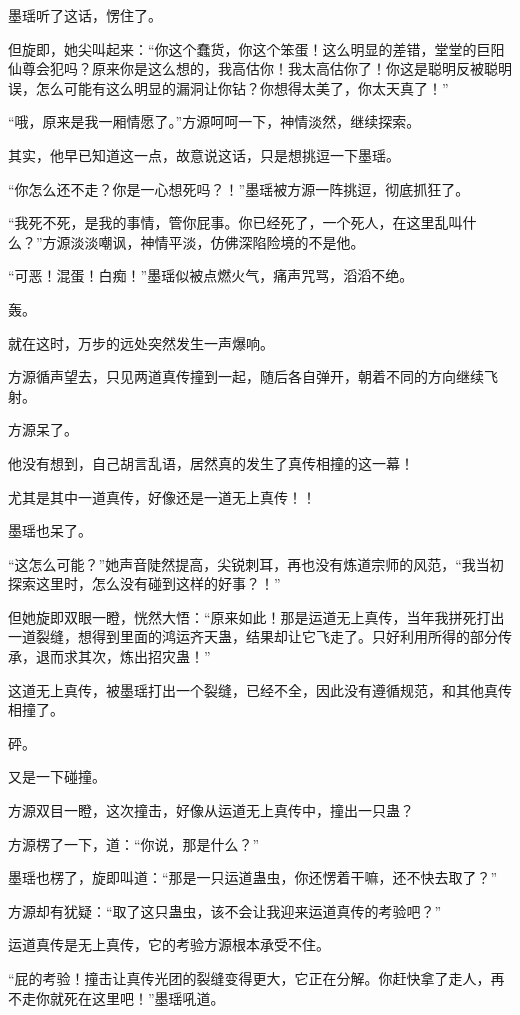 \begin{this_body}
墨瑶听了这话，愣住了。

但旋即，她尖叫起来：“你这个蠢货，你这个笨蛋！这么明显的差错，堂堂的巨阳仙尊会犯吗？原来你是这么想的，我高估你！我太高估你了！你这是聪明反被聪明误，怎么可能有这么明显的漏洞让你钻？你想得太美了，你太天真了！”

“哦，原来是我一厢情愿了。”方源呵呵一下，神情淡然，继续探索。

其实，他早已知道这一点，故意说这话，只是想挑逗一下墨瑶。

“你怎么还不走？你是一心想死吗？！”墨瑶被方源一阵挑逗，彻底抓狂了。

“我死不死，是我的事情，管你屁事。你已经死了，一个死人，在这里乱叫什么？”方源淡淡嘲讽，神情平淡，仿佛深陷险境的不是他。

“可恶！混蛋！白痴！”墨瑶似被点燃火气，痛声咒骂，滔滔不绝。

轰。

就在这时，万步的远处突然发生一声爆响。

方源循声望去，只见两道真传撞到一起，随后各自弹开，朝着不同的方向继续飞射。

方源呆了。

他没有想到，自己胡言乱语，居然真的发生了真传相撞的这一幕！

尤其是其中一道真传，好像还是一道无上真传！！

墨瑶也呆了。

“这怎么可能？”她声音陡然提高，尖锐刺耳，再也没有炼道宗师的风范，“我当初探索这里时，怎么没有碰到这样的好事？！”

但她旋即双眼一瞪，恍然大悟：“原来如此！那是运道无上真传，当年我拼死打出一道裂缝，想得到里面的鸿运齐天蛊，结果却让它飞走了。只好利用所得的部分传承，退而求其次，炼出招灾蛊！”

这道无上真传，被墨瑶打出一个裂缝，已经不全，因此没有遵循规范，和其他真传相撞了。

砰。

又是一下碰撞。

方源双目一瞪，这次撞击，好像从运道无上真传中，撞出一只蛊？

方源楞了一下，道：“你说，那是什么？”

墨瑶也楞了，旋即叫道：“那是一只运道蛊虫，你还愣着干嘛，还不快去取了？”

方源却有犹疑：“取了这只蛊虫，该不会让我迎来运道真传的考验吧？”

运道真传是无上真传，它的考验方源根本承受不住。

“屁的考验！撞击让真传光团的裂缝变得更大，它正在分解。你赶快拿了走人，再不走你就死在这里吧！”墨瑶吼道。


\end{this_body}
